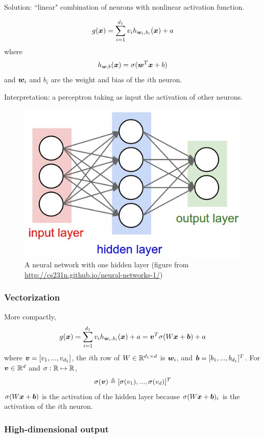 \documentclass{article}
\begin{document}
Solution: ``linear" combination of neurons with nonlinear activation function.

\[
g({\bm x}) = \sum_{i = 1}^{d_1} v_i h_{{\bm w}_i, b_i} ({\bm x}) + a
\]
where
\[
h_{{\bm w}, b} ({\bm x}) = \sigma({\bm w}^T {\bm x} + b)
\]
and ${\bm w}_i$ and $b_i$ are the weight and bias of the $i$th neuron.

Interpretation: a perceptron taking as input the activation of other neurons.

\begin{figure}
\centering
\includegraphics[scale=0.2, valign=t]{neural_net}
\caption{A neural network with one hidden layer (figure from \url{http://cs231n.github.io/neural-networks-1/})}
\end{figure}

\subsubsection{Vectorization}

More compactly,
\[
g({\bm x})
= \sum_{i = 1}^{d_1} v_i h_{{\bm w}_i, b_i} ({\bm x}) + a
= {\bm v}^T \sigma (W {\bm x} + {\bm b}) + a
\]
where ${\bm v} = [v_1, ..., v_{d_1}]$, the $i$th row of $W \in {\mathbb R}^{d_1 \times d}$ is ${\bm w}_i$, and ${\bm b} = [b_1, ..., b_{d_1}]^T$.
For ${\bm v} \in {\mathbb R}^d$ and $\sigma: {\mathbb R} \mapsto {\mathbb R}$,
\[
\sigma ({\bm v}) \triangleq [\sigma (v_1), ..., \sigma (v_d)]^T
\]
$\sigma (W {\bm x} + {\bm b})$ is the activation of the hidden layer because $\sigma (W {\bm x} + {\bm b})_i$ is the activation of the $i$th neuron.

\subsubsection{High-dimensional output}
\end{document}
